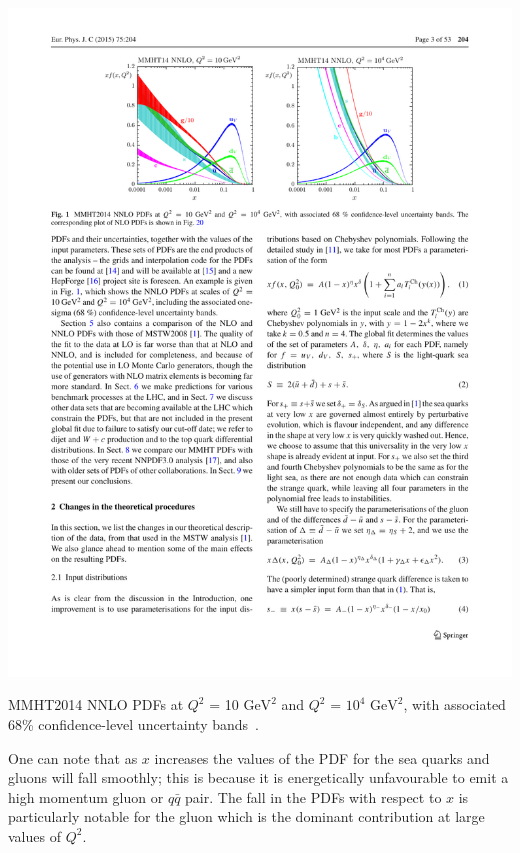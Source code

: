 \begin{table}[!hbt]
  \begin{center}
    \includegraphics[width=1\linewidth, angle=0]{figs/Theory/qcd_pdf.pdf}
  \end{center}
  \caption[MMHT2014 NNLO PDFs at $Q^2$ = 10 $\text{GeV}^2$ and $Q^2$ = $10^4$ $\text{GeV}^2$, with associated 68\% confidence-level uncertainty bands.]
  {MMHT2014 NNLO PDFs at $Q^2$ = 10 $\text{GeV}^2$ and $Q^2$ = $10^4$ $\text{GeV}^2$, with associated 68\% confidence-level uncertainty bands~\cite{theo-qcd_pdf}.}
  \label{fig:theo-qcd_pdf}
\end{table}

One can note that as $x$ increases the values of the PDF for the sea quarks and gluons will fall smoothly;
this is because it is energetically unfavourable to emit a high momentum gluon or $q\bar{q}$ pair.
The fall in the PDFs with respect to $x$ is particularly notable for the gluon which is the dominant contribution at large values of $Q^2$.

